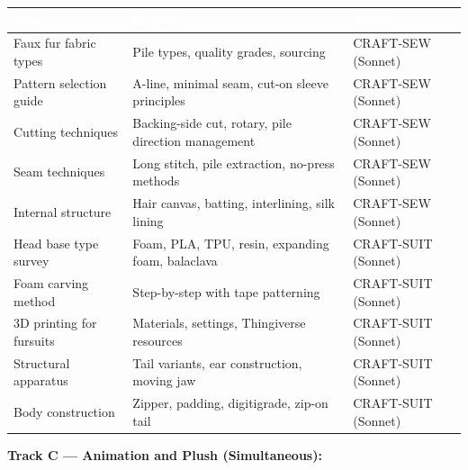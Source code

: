\documentclass[11pt,letterpaper]{article}
\newcommand{\tableheader}[1]{\textbf{\sffamily\textcolor{white}{#1}}}
\begin{document}
\begin{center}
\begin{tabularx}{\textwidth}{L{3.5cm}XC{2cm}}
\toprule
{}
\tableheader{Task} & \tableheader{Output} & \tableheader{Agent} \\
\midrule
Faux fur fabric types & Pile types, quality grades, sourcing & CRAFT-SEW (Sonnet) \\
Pattern selection guide & A-line, minimal seam, cut-on sleeve principles & CRAFT-SEW (Sonnet) \\
Cutting techniques & Backing-side cut, rotary, pile direction management & CRAFT-SEW (Sonnet) \\
Seam techniques & Long stitch, pile extraction, no-press methods & CRAFT-SEW (Sonnet) \\
Internal structure & Hair canvas, batting, interlining, silk lining & CRAFT-SEW (Sonnet) \\
Head base type survey & Foam, PLA, TPU, resin, expanding foam, balaclava & CRAFT-SUIT (Sonnet) \\
Foam carving method & Step-by-step with tape patterning & CRAFT-SUIT (Sonnet) \\
3D printing for fursuits & Materials, settings, Thingiverse resources & CRAFT-SUIT (Sonnet) \\
Structural apparatus & Tail variants, ear construction, moving jaw & CRAFT-SUIT (Sonnet) \\
Body construction & Zipper, padding, digitigrade, zip-on tail & CRAFT-SUIT (Sonnet) \\
\bottomrule
\end{tabularx}
\end{center}

\textbf{Track C --- Animation and Plush (Simultaneous):}
\end{document}
